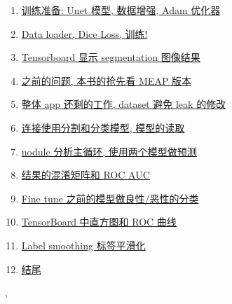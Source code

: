 \documentclass[11pt]{article}
\renewcommand{\today}{\shortmonthname[\the\month] \the \day,  \the\year}
\begin{document}
\begin{multicols}{2}
\begin{enumerate}
		\item \href{https://mp.weixin.qq.com/s/-JjDf_BtB53sCdyLgIvmxg}{训练准备: Unet 模型, 数据增强, Adam 优化器}	%
		\item \href{https://mp.weixin.qq.com/s/Fplkh2gBhFT7jqjaGMf-pA}{Data loader, Dice Loss, 训练!}	%
		\item \href{https://mp.weixin.qq.com/s/iXBZWaESuz5-RnxLDZmnIg}{Tensorboard 显示 segmentation 图像结果}	%
		\item \href{https://mp.weixin.qq.com/s/PxIMdRbtdxER8dASkXd3Hg}{之前的问题, 本书的抢先看 MEAP 版本}	%
		\item \href{https://mp.weixin.qq.com/s/OqWj7TkOxfxr-AmBWQgU7w}{整体 app 还剩的工作, dataset 避免 leak 的修改}	%
		\item \href{https://mp.weixin.qq.com/s/ncCBnC5OcjYccLQypv-6VQ}{连接使用分割和分类模型, 模型的读取}	%
		\item \href{https://mp.weixin.qq.com/s/aUyxMsG5CVsbUGOUGUXAxA}{nodule 分析主循环, 使用两个模型做预测}	%
		\item \href{https://mp.weixin.qq.com/s/4QbW1jKzunJRagQHA40usQ}{结果的混淆矩阵和 ROC AUC}	%
		\item \href{https://mp.weixin.qq.com/s/BhvLHM3M-IxPSTXmYfIMfQ}{Fine tune 之前的模型做良性/恶性的分类}	%
		\item \href{https://mp.weixin.qq.com/s/14XGf6vGCA1_7hyu0I5fmQ}{TensorBoard 中直方图和 ROC 曲线}	%
		\item \href{https://mp.weixin.qq.com/s/FAuBkJb-HGrYgvNE63rscw}{Label smoothing 标签平滑化}	%
		\item \href{https://mp.weixin.qq.com/s/r42qBNtzC1Yb_EXiORQj1w}{结尾}	%
	\end{enumerate}
\end{multicols}






%
\begin{flushright}
	\tiny \today 
\end{flushright}
\end{document}
